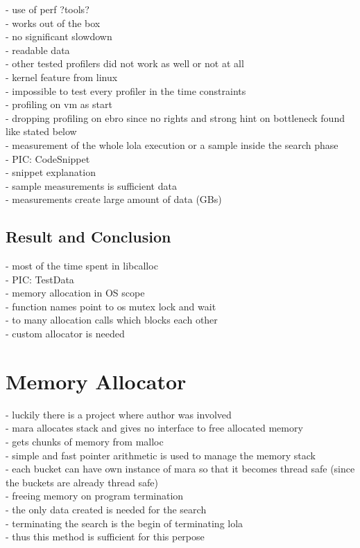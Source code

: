 - use of perf ?tools?\\%
- works out of the box\\%
- no significant slowdown\\
- readable data\\
- other tested profilers did not work as well or not at all\\
- kernel feature from linux\\
- impossible to test every profiler in the time constraints\\
- profiling on vm as start\\%
- dropping profiling on ebro since no rights and strong hint on bottleneck found like stated below\\%
- measurement of the whole lola execution or a sample inside the search phase\\%
- PIC: CodeSnippet\\
- snippet explanation\\
- sample measurements is sufficient data\\ %
- measurements create large amount of data (GBs)\\

\subsection{Result and Conclusion}
- most of the time spent in libcalloc\\
- PIC: TestData\\
- memory allocation in OS scope\\
- function names point to os mutex lock and wait\\
- to many allocation calls which blocks each other\\
- custom allocator is needed\\

\section{Memory Allocator}
- luckily there is a project where author was involved\\
- mara allocates stack and gives no interface to free allocated memory\\
- gets chunks of memory from malloc\\
- simple and fast pointer arithmetic is used to manage the memory stack\\
- each bucket can have own instance of mara so that it becomes thread safe (since the buckets are already thread safe)\\
- freeing memory on program termination\\
- the only data created is needed for the search\\
- terminating the search is the begin of terminating lola\\
- thus this method is sufficient for this perpose\\ 

